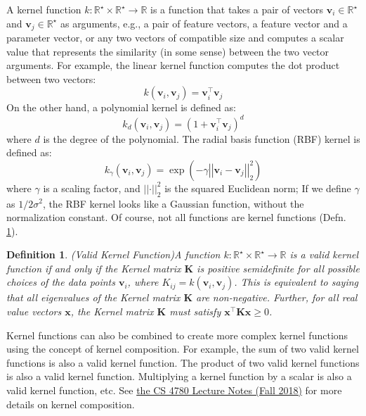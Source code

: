 \documentclass{article}[11pt]
\newtheorem{defn}{Definition}
\def\R{\mathbb{R}}
\newcommand{\norm}[1]{\left|\left|#1\right|\right|}
\begin{document}
A kernel function $k:\mathbb{R}^{\star}\times\R^{\star}\to\R$ is a function that takes a pair of vectors 
$\mathbf{v}_i\in\R^{\star}$ and $\mathbf{v}_j\in\R^{\star}$ as arguments, 
e.g., a pair of feature vectors, a feature vector and a parameter vector, or any two vectors of compatible size 
and computes a scalar value that represents the similarity (in some sense) between the two vector arguments.
For example, the linear kernel function computes the dot product between two vectors:
\begin{equation}
k(\mathbf{v}_i, \mathbf{v}_j) = \mathbf{v}_i^{\top}\mathbf{v}_j
\end{equation}
On the other hand, a polynomial kernel is defined as:
\begin{equation}
k_{d}(\mathbf{v}_i, \mathbf{v}_j) = (1+\mathbf{v}_i^{\top}\mathbf{v}_j)^d
\end{equation}
where $d$ is the degree of the polynomial. The radial basis function (RBF) kernel is defined as:
\begin{equation}
k_{\gamma}(\mathbf{v}_i, \mathbf{v}_j) = \exp(-\gamma \norm{\mathbf{v}_i - \mathbf{v}_j}_{2}^2)
\end{equation}
where $\gamma$ is a scaling factor, and $\norm{\cdot}^{2}_{2}$ is the squared Euclidean norm;
If we define $\gamma$ as ${1}/{2\sigma^2}$, the RBF kernel looks like a Gaussian function, without the normalization constant.
Of course, not all functions are kernel functions (Defn. \ref{def:kernel-valid}).
\begin{defn}{(Valid Kernel Function)}\label{def:kernel-valid}
A function $k:\mathbb{R}^{\star}\times\R^{\star}\to\R$ is a valid kernel function if and only if the Kernel matrix $\mathbf{K}$ is positive 
semidefinite for all possible choices of the data points $\mathbf{v}_i$, where $K_{ij} = k(\mathbf{v}_i, \mathbf{v}_j)$.
This is equivalent to saying that all eigenvalues of the Kernel matrix $\mathbf{K}$ are non-negative.
Further, for all real value vectors $\mathbf{x}$, the Kernel matrix $\mathbf{K}$ must satisfy $\mathbf{x}^{\top}\mathbf{K}\mathbf{x} \geq 0$.
\end{defn}
Kernel functions can also be combined to create more complex kernel functions using the concept of kernel composition.
For example, the sum of two valid kernel functions is also a valid kernel function. 
The product of two valid kernel functions is also a valid kernel function. 
Multiplying a kernel function by a scalar is also a valid kernel function, etc.
See \href{https://www.cs.cornell.edu/courses/cs4780/2018fa/lectures/lecturenote14.html}{the CS 4780 Lecture Notes (Fall 2018)} for more details on kernel composition.
\end{document}
